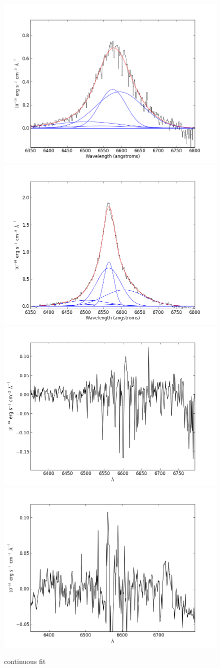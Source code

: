 \documentclass[usenatbib]{mn2e}
\begin{document}
\newpage


\begin{figure}
\begin{center}
\includegraphics[width=0.46\linewidth,angle=0]{Halpha_6.png}
\vspace{5mm}
\includegraphics[width=0.49\linewidth,angle=0]{Halpha_7.png}\\
\includegraphics[width=0.46\linewidth,angle=0]{Halpha_res_6.png}
\hspace{5mm}
\includegraphics[width=0.49\linewidth,angle=0]{Halpha_res_7.png}\\
\end{center} 
\caption{continuous fit \label{fig:landscape}}   
\end{figure}
\end{document}
